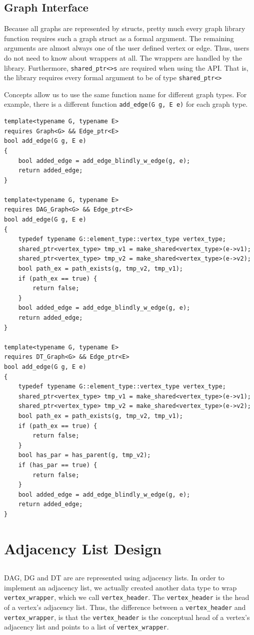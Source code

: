 \documentclass[12pt]{article}
\begin{document}
\subsection{Graph Interface}
Because all graphs are represented by structs, pretty much every graph library function requires such a graph struct as a formal argument. The remaining arguments are almost always one of the user defined vertex or edge. Thus, users do not need to know about wrappers at all. The wrappers are handled by the library. Furthermore, \texttt{shared\_ptr<>s} are required when using the API. That is, the library requires every formal argument to be of type \texttt{shared\_ptr<>} 
\par
Concepts allow us to use the same function name for different graph types. For example, there is a different function \texttt{add\_edge(G g, E e)} for each graph type.
\begin{lstlisting}
template<typename G, typename E>
requires Graph<G> && Edge_ptr<E>
bool add_edge(G g, E e)
{
	bool added_edge = add_edge_blindly_w_edge(g, e);
	return added_edge;
}

template<typename G, typename E>
requires DAG_Graph<G> && Edge_ptr<E>
bool add_edge(G g, E e)
{
	typedef typename G::element_type::vertex_type vertex_type;
	shared_ptr<vertex_type> tmp_v1 = make_shared<vertex_type>(e->v1);
	shared_ptr<vertex_type> tmp_v2 = make_shared<vertex_type>(e->v2);
	bool path_ex = path_exists(g, tmp_v2, tmp_v1);
	if (path_ex == true) {
		return false;
	} 
	bool added_edge = add_edge_blindly_w_edge(g, e);
	return added_edge;
}

template<typename G, typename E>
requires DT_Graph<G> && Edge_ptr<E>
bool add_edge(G g, E e)
{
	typedef typename G::element_type::vertex_type vertex_type;
	shared_ptr<vertex_type> tmp_v1 = make_shared<vertex_type>(e->v1);
	shared_ptr<vertex_type> tmp_v2 = make_shared<vertex_type>(e->v2);
	bool path_ex = path_exists(g, tmp_v2, tmp_v1);
	if (path_ex == true) {
		return false;
	}
	bool has_par = has_parent(g, tmp_v2);
	if (has_par == true) {
		return false;
	}
	bool added_edge = add_edge_blindly_w_edge(g, e);
	return added_edge;
}
\end{lstlisting}

\section{Adjacency List Design}
\subsection{}
DAG, DG and DT are are represented using adjacency lists. In order to implement an adjacency list, we actually created another data type to wrap \texttt{vertex\_wrapper}, which we call \texttt{vertex\_header}. The \texttt{vertex\_header} is the head of a vertex's adjacency list. Thus, the difference between a \texttt{vertex\_header} and \texttt{vertex\_wrapper}, is that the \texttt{vertex\_header} is the conceptual head of a vertex's adjacency list and points to a list of \texttt{vertex\_wrapper}.
\end{document}
